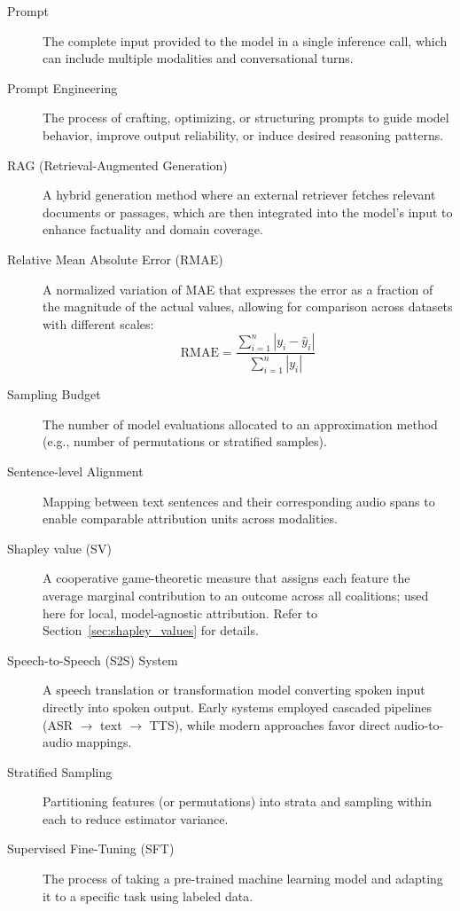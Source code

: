 \begin{description}
    \item[Prompt] The complete input provided to the model in a single inference call, which can include multiple modalities and conversational turns.

    \item[Prompt Engineering] The process of crafting, optimizing, or structuring prompts to guide model behavior, improve output reliability, or induce desired reasoning patterns.

    \item[RAG (Retrieval-Augmented Generation)] A hybrid generation method where an external retriever fetches relevant documents or passages, which are then integrated into the model’s input to enhance factuality and domain coverage.

    \item[Relative Mean Absolute Error (RMAE)] A normalized variation of MAE that expresses the error as a fraction of the magnitude of the actual values, allowing for comparison across datasets with different scales:
    \[
    \text{RMAE} = \frac{\sum_{i=1}^{n} |y_i - \hat{y}_i|}{\sum_{i=1}^{n} |y_i|}
    \]

    \item[Sampling Budget] The number of model evaluations allocated to an approximation method (e.g., number of permutations or stratified samples).

    \item[Sentence-level Alignment] Mapping between text sentences and their corresponding audio spans to enable comparable attribution units across modalities.

    \item[Shapley value (SV)] A cooperative game-theoretic measure that assigns each feature the average marginal contribution to an outcome across all coalitions; used here for local, model-agnostic attribution. Refer to Section~\ref{sec:shapley_values} for details.

    \item[Speech-to-Speech (S2S) System] A speech translation or transformation model converting spoken input directly into spoken output. Early systems employed cascaded pipelines (ASR $\to$ text $\to$ TTS), while modern approaches favor direct audio-to-audio mappings.

    \item[Stratified Sampling] Partitioning features (or permutations) into strata and sampling within each to reduce estimator variance.

    \item[Supervised Fine-Tuning (SFT)] The process of taking a pre-trained machine learning model and adapting it to a specific task using labeled data.


\end{description}
